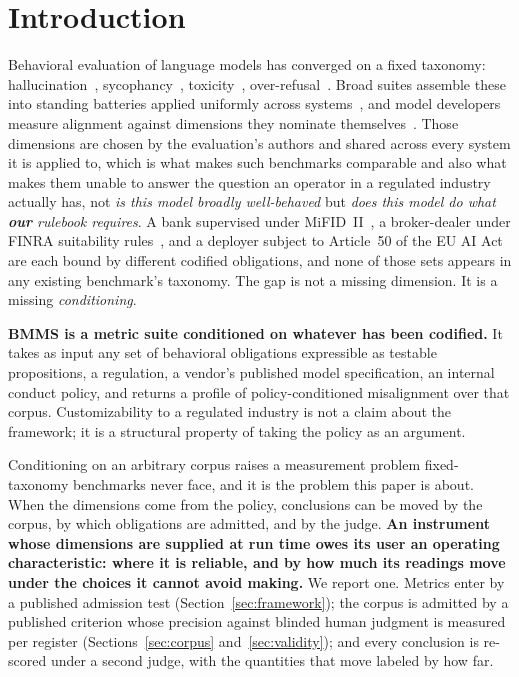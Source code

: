 \documentclass{article}
\begin{document}
\section{Introduction}
\label{sec:intro}

Behavioral evaluation of language models has converged on a fixed taxonomy:
hallucination~\cite{lin2022truthfulqa}, sycophancy~\cite{sharma2023sycophancy},
toxicity~\cite{gehman2020realtoxicity}, over-refusal~\cite{rottger2024xstest}. Broad suites
assemble these into standing batteries applied uniformly across
systems~\cite{liang2023helm,wang2023decodingtrust,sun2024trustllm}, and model developers measure
alignment against dimensions they nominate themselves~\cite{perez2023mwe,bai2022constitutional}.
Those dimensions are chosen by the evaluation's authors and
shared across every system it is applied to, which is what makes such benchmarks comparable and
also what makes them unable to answer the question an operator in a regulated industry actually
has, not \emph{is this model broadly well-behaved} but \emph{does this model do what
\textbf{our} rulebook requires}. A bank supervised under MiFID~II~\cite{mifid2directive}, a
broker-dealer under FINRA suitability rules~\cite{finra2024ai}, and a deployer subject to
Article~50 of the EU AI Act~\cite{euaiact2024} are each bound by different codified obligations,
and none of those sets appears in any existing benchmark's taxonomy. The gap is not a missing
dimension. It is a missing \emph{conditioning}.

\textbf{BMMS is a metric suite conditioned on whatever has been codified.} It takes as input any
set of behavioral obligations expressible as testable propositions, a regulation, a vendor's
published model specification, an internal conduct policy, and returns a profile of
policy-conditioned misalignment over that corpus. Customizability to a regulated industry is not
a claim about the framework; it is a structural property of taking the policy as an argument.

Conditioning on an arbitrary corpus raises a measurement problem fixed-taxonomy benchmarks never
face, and it is the problem this paper is about. When the dimensions come from the policy,
conclusions can be moved by the corpus, by which obligations are admitted, and by the judge.
\textbf{An instrument whose dimensions are supplied at run time owes its user an operating
characteristic: where it is reliable, and by how much its readings move under the choices it
cannot avoid making.} We report one. Metrics enter by a published admission test
(Section~\ref{sec:framework}); the corpus is admitted by a published criterion whose precision
against blinded human judgment is measured per register (Sections~\ref{sec:corpus}
and~\ref{sec:validity}); and every conclusion is re-scored under a second judge, with the
quantities that move labeled by how far.
\end{document}
